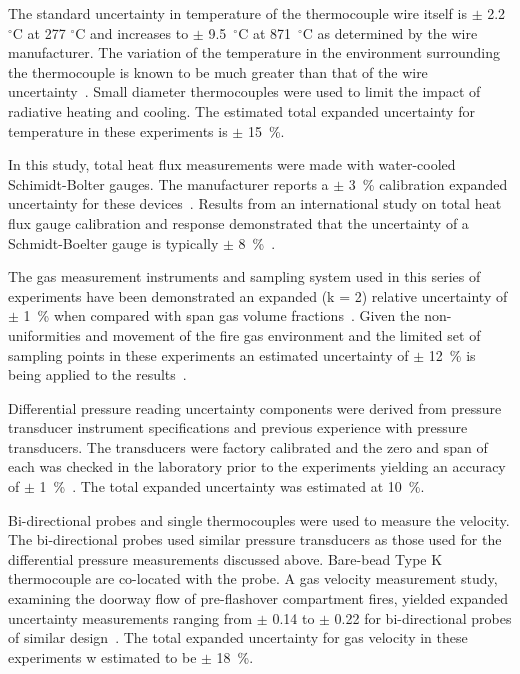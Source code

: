 \documentclass[12pt,oneside]{book}
\begin{document}
The standard uncertainty in temperature of the thermocouple wire itself is $\pm$ 2.2 $^{\circ}$C at 277 $^{\circ}$C and increases to $\pm$ 9.5~$^{\circ}$C at 871~$^{\circ}$C as determined by the wire manufacturer\cite{Omega:2004}. The variation of the temperature in the environment surrounding the thermocouple is known to be much greater than that of the wire uncertainty~\cite{Blevins:1999,Pitts:2003}. Small diameter thermocouples were used to limit the impact of radiative heating and cooling. The estimated total expanded uncertainty for temperature in these experiments is $\pm$ 15~\%.

In this study, total heat flux measurements were made with water-cooled Schimidt-Bolter gauges. The manufacturer reports a $\pm$ 3~\% calibration expanded uncertainty for these devices~\cite{Medtherm:2003}. Results from an international study on total heat flux gauge calibration and response demonstrated that the uncertainty of a Schmidt-Boelter gauge is typically $\pm$ 8~\%~\cite{Pitts:2006}.

The gas measurement instruments and sampling system used in this series of experiments have been demonstrated an expanded (k = 2) relative uncertainty of $\pm$ 1~\% when compared with span gas volume fractions~\cite{Bundy:2007}. Given the non-uniformities and movement of the fire gas environment and the limited set of sampling points in these experiments an estimated uncertainty of $\pm$ 12~\% is being applied to the results~\cite{Lock:1}.

Differential pressure reading uncertainty components were derived from pressure transducer instrument specifications and previous experience with pressure transducers. The transducers were factory calibrated and the zero and span of each was checked in the laboratory prior to the experiments yielding an accuracy of $\pm$ 1~\%~\cite{Setra:2002}. The total expanded uncertainty was estimated at 10~\%.

Bi-directional probes and single thermocouples were used to measure the velocity.  The bi-directional probes used similar pressure transducers as those used for the differential pressure measurements discussed above. Bare-bead Type K thermocouple are co-located with the probe. A gas velocity measurement study, examining the doorway flow of pre-flashover compartment fires, yielded expanded uncertainty measurements ranging from $\pm$ 0.14 to $\pm$ 0.22 for bi-directional probes of similar design~\cite{Bryant:FSJ2009}. The total expanded uncertainty for gas velocity in these experiments w estimated to be  $\pm$ 18~\%.
\end{document}
